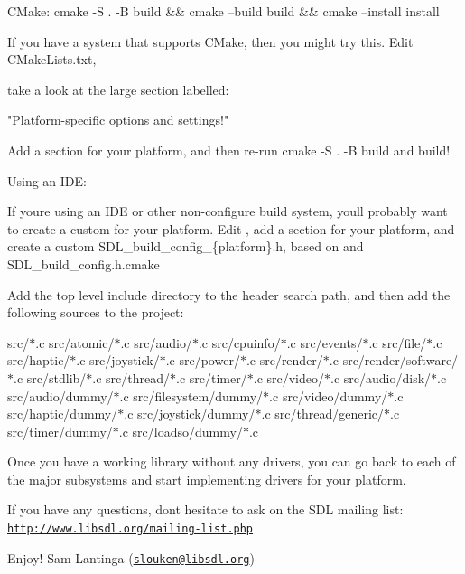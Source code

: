 \begin{DoxyEnumerate}
\item CMake:\+ cmake -\/S . -\/B build \&\& cmake --build build \&\& cmake --install install

If you have a system that supports CMake, then you might try this. Edit CMake\+Lists.\+txt,

take a look at the large section labelled:\+

"{}\+Platform-\/specific options and settings!"{}

Add a section for your platform, and then re-\/run \textquotesingle{}cmake -\/S . -\/B build\textquotesingle{} and build!
\item Using an IDE:\+

If you\textquotesingle{}re using an IDE or other non-\/configure build system, you\textquotesingle{}ll probably want to create a custom {\ttfamily {}} for your platform. Edit {\ttfamily {}}, add a section for your platform, and create a custom {\ttfamily SDL\+\_\+build\+\_\+config\+\_\+\{platform\}.h}, based on {\ttfamily {}} and {\ttfamily SDL\+\_\+build\+\_\+config.\+h.\+cmake}

Add the top level include directory to the header search path, and then add the following sources to the project:\+

src/\+\texorpdfstring{$\ast$}{*}.c src/\+atomic/\+\texorpdfstring{$\ast$}{*}.c src/\+audio/\+\texorpdfstring{$\ast$}{*}.c src/\+cpuinfo/\+\texorpdfstring{$\ast$}{*}.c src/\+events/\+\texorpdfstring{$\ast$}{*}.c src/\+file/\+\texorpdfstring{$\ast$}{*}.c src/\+haptic/\+\texorpdfstring{$\ast$}{*}.c src/\+joystick/\+\texorpdfstring{$\ast$}{*}.c src/\+power/\+\texorpdfstring{$\ast$}{*}.c src/\+render/\+\texorpdfstring{$\ast$}{*}.c src/\+render/\+software/\+\texorpdfstring{$\ast$}{*}.c src/\+stdlib/\+\texorpdfstring{$\ast$}{*}.c src/\+thread/\+\texorpdfstring{$\ast$}{*}.c src/\+timer/\+\texorpdfstring{$\ast$}{*}.c src/\+video/\+\texorpdfstring{$\ast$}{*}.c src/\+audio/\+disk/\+\texorpdfstring{$\ast$}{*}.c src/\+audio/\+dummy/\+\texorpdfstring{$\ast$}{*}.c src/\+filesystem/\+dummy/\+\texorpdfstring{$\ast$}{*}.c src/\+video/\+dummy/\+\texorpdfstring{$\ast$}{*}.c src/\+haptic/\+dummy/\+\texorpdfstring{$\ast$}{*}.c src/\+joystick/\+dummy/\+\texorpdfstring{$\ast$}{*}.c src/\+thread/\+generic/\+\texorpdfstring{$\ast$}{*}.c src/\+timer/\+dummy/\+\texorpdfstring{$\ast$}{*}.c src/\+loadso/\+dummy/\+\texorpdfstring{$\ast$}{*}.c
\end{DoxyEnumerate}

Once you have a working library without any drivers, you can go back to each of the major subsystems and start implementing drivers for your platform.

If you have any questions, don\textquotesingle{}t hesitate to ask on the SDL mailing list:\+ \href{http://www.libsdl.org/mailing-list.php}{\texttt{http:\+/\+/\+www.\+libsdl.\+org/\+mailing-\/list.\+php}}

Enjoy! Sam Lantinga (\href{mailto:slouken@libsdl.org}{\texttt{slouken@libsdl.\+org}}) 